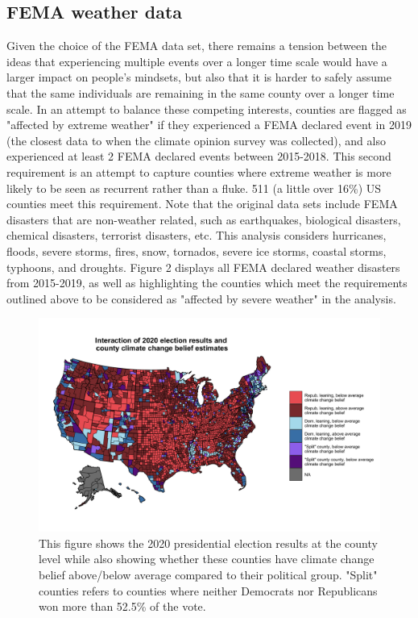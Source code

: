 \documentclass{article}
\begin{document}
\subsection{FEMA weather data}
Given the choice of the FEMA data set, there remains a tension between the
ideas that experiencing multiple events over a longer time scale would have
a larger impact on people's mindsets, but also that it is harder to safely
assume that the same individuals are remaining in the same county over a
longer time scale. In an attempt to balance these competing interests,
counties are flagged as "affected by extreme weather" if they experienced
a FEMA declared event in 2019 (the closest data to when the climate opinion
survey was collected), and also experienced at least 2 FEMA declared events
between 2015-2018. This second requirement is an attempt to capture counties
where extreme weather is more likely to be seen as recurrent rather than a
fluke. 511 (a little over 16\%) US counties meet this requirement. Note that
the original data sets include FEMA disasters that are non-weather related,
such as earthquakes, biological disasters, chemical disasters, terrorist
disasters, etc. This analysis considers hurricanes, floods, severe storms,
fires, snow, tornados, severe ice storms, coastal storms, typhoons, and
droughts. Figure 2 displays all FEMA declared weather disasters from 2015-2019,
as well as highlighting the counties which meet the requirements outlined above
to be considered as "affected by severe weather" in the analysis.

\begin{figure}[H]
\centering
\includegraphics[scale=0.225]{images/election_climate_beliefs_map_in_group_comp.png}
\caption{This figure shows the 2020 presidential election results at the county level while also showing whether these counties have climate change belief above/below average compared to their political group. "Split" counties refers to counties where neither Democrats nor Republicans won more than 52.5\% of the vote.}
\end{figure}
\end{document}
